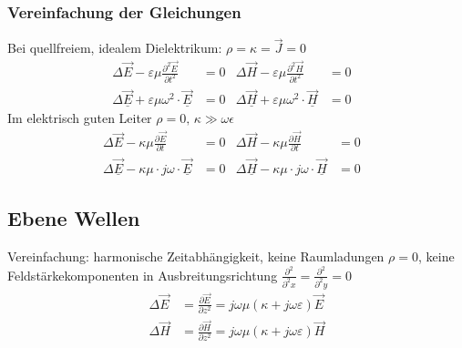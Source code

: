 \subsubsection{Vereinfachung der Gleichungen}
Bei quellfreiem, idealem Dielektrikum: $ \rho = \kappa = \vec{J} = 0$
\begin{align*}
	\Delta \vec{E}-\varepsilon \mu \frac{\partial^{2} \vec{E}}{\partial t^{2}} & =0 & 
	\Delta \vec{H}-\varepsilon \mu \frac{\partial^{2} \vec{H}}{\partial t^{2}} & =0 &\\
	\Delta \underline{\vec{E}}+\varepsilon \mu \omega^{2} \cdot \underline{\vec{E}} & =0 &
	\Delta \underline{\vec{H}}+\varepsilon \mu \omega^{2} \cdot \underline{\vec{H}} & =0 &
\end{align*}
Im elektrisch guten Leiter $\rho = 0,\, \kappa \gg \omega \epsilon$
\begin{align*}
	\Delta \vec{E}-\kappa \mu \frac{\partial \vec{E}}{\partial t} & =0 & 
	\Delta \vec{H}-\kappa \mu \frac{\partial \vec{H}}{\partial t} & =0 &\\
	\Delta \underline{\vec{E}}-\kappa \mu \cdot j \omega \cdot \underline{\vec{E}} & =0 &
	\Delta \underline{\vec{H}}-\kappa \mu \cdot j \omega \cdot \underline{\vec{H}} & =0 &
\end{align*}


\subsection{Ebene Wellen}
Vereinfachung: harmonische Zeitabhängigkeit, keine Raumladungen $ \rho = 0 $, keine Feldstärkekomponenten in Ausbreitungsrichtung $ \frac{\partial^2 }{\partial^2 x} = \frac{\partial^2 }{\partial^2 y} = 0 $
\begin{align*}
	\Delta \vec{E} & = \frac{ \partial \vec{E}}{ \partial z^2} = j \omega \mu ( \kappa + j \omega \varepsilon) \vec{E} \\
	\Delta \vec{H} & = \frac{ \partial \vec{H}}{ \partial z^2} = j \omega \mu ( \kappa + j \omega \varepsilon) \vec{H}
\end{align*}

